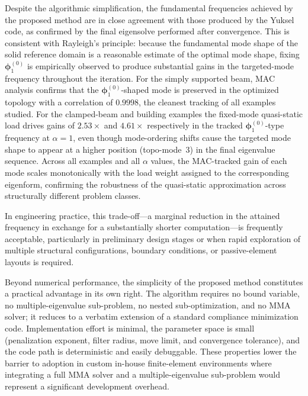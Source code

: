 \documentclass[pdflatex,lineno,sn-mathphys-ay]{sn-jnl}
\begin{document}
\begin{sloppypar}
Despite the algorithmic simplification, the fundamental frequencies achieved by the proposed method are in close agreement with those produced by the Yuksel code, as confirmed by the final eigensolve performed after convergence.  This is consistent with Rayleigh's principle: because the fundamental mode shape of the solid reference domain is a reasonable estimate of the optimal mode shape, fixing $\boldsymbol{\phi}_1^{(0)}$ is empirically observed to produce substantial gains in the targeted-mode frequency throughout the iteration.  For the simply supported beam, MAC analysis confirms that the $\boldsymbol{\phi}_1^{(0)}$-shaped mode is preserved in the optimized topology with a correlation of $0.9998$, the cleanest tracking of all examples studied.  For the clamped-beam and building examples the fixed-mode quasi-static load drives gains of $2.53\times$ and $4.61\times$ respectively in the tracked $\boldsymbol{\phi}_1^{(0)}$-type frequency at $\alpha=1$, even though mode-ordering shifts cause the targeted mode shape to appear at a higher position (topo-mode~3) in the final eigenvalue sequence.  Across all examples and all $\alpha$ values, the MAC-tracked gain of each mode scales monotonically with the load weight assigned to the corresponding eigenform, confirming the robustness of the quasi-static approximation across structurally different problem classes.

In engineering practice, this trade-off---a marginal reduction in the attained frequency in exchange for a substantially shorter computation---is frequently acceptable, particularly in preliminary design stages or when rapid exploration of multiple structural configurations, boundary conditions, or passive-element layouts is required.
\end{sloppypar}

Beyond numerical performance, the simplicity of the proposed method constitutes a practical advantage in its own right.  The algorithm requires no bound variable, no multiple-eigenvalue sub-problem, no nested sub-optimization, and no MMA solver; it reduces to a verbatim extension of a standard compliance minimization code. Implementation effort is minimal, the
parameter space is small (penalization exponent, filter radius, move limit, and convergence tolerance), and the code path is deterministic and easily debuggable.  These properties lower the barrier to adoption in custom in-house finite-element environments where integrating a full MMA solver and a multiple-eigenvalue sub-problem would represent a significant development
overhead.
\end{document}
